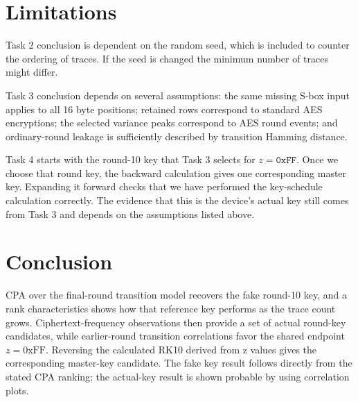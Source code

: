 \documentclass[conference,10pt,letterpaper]{IEEEtran}
\begin{document}
\section{Limitations}

Task 2 conclusion is dependent on the random seed, which is included to counter the ordering of traces. If the seed is changed the minimum number of traces might differ.

Task 3 conclusion depends on several assumptions: the same missing S-box input applies to all 16 byte positions; retained rows correspond to standard AES encryptions; the selected variance peaks correspond to AES round events; and ordinary-round leakage is sufficiently described by transition Hamming distance.

Task 4 starts with the round-10 key that Task 3 selects for $z=\texttt{0xFF}$. Once we choose that round key, the backward calculation gives one corresponding master key. Expanding it forward checks that we have performed the key-schedule calculation correctly. The evidence that this is the device's actual key still comes from Task 3 and depends on the assumptions listed above.

\section{Conclusion}
CPA over the final-round transition model recovers the fake round-10 key, and a rank characteristics shows how that reference key performs as the trace count grows. Ciphertext-frequency observations then provide a set of actual round-key candidates, while earlier-round transition correlations favor the shared endpoint $z=0\mathrm{xFF}$. Reversing the calculated RK10 derived from z values gives the corresponding master-key candidate. The fake key result follows directly from the stated CPA ranking; the actual-key result is shown probable by using correlation plots.
\end{document}
